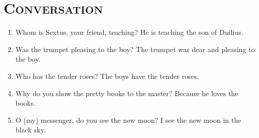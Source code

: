 \documentclass[12pt]{article}
\begin{document}
\section{\textsc{Conversation}}
\begin{enumerate}[1.]
	\item Whom is Sextus, your friend, teaching? He is teaching the son of Duilius.
	\item Was the trumpet pleasing to the boy? The trumpet was dear and pleasing to the boy.
	\item Who has the tender roses? The boys have the tender roses.
	\item Why do you show the pretty books to the master? Because he loves the books.
	\item O (my) messenger, do you see the new moon? I see the new moon in the black sky.
\end{enumerate}
\end{document}
